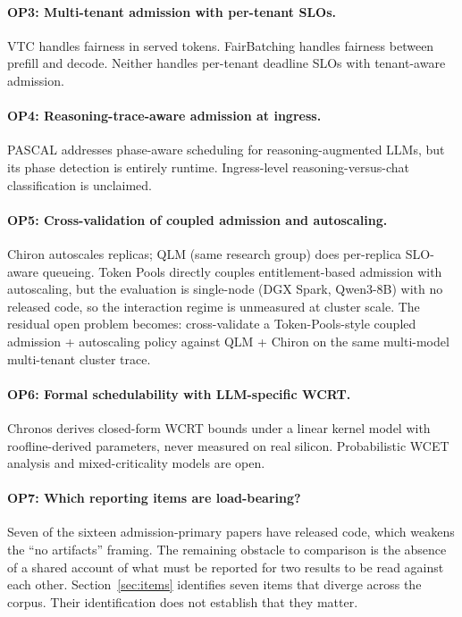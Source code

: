 \documentclass[10pt]{article} %
\theoremstyle{definition}
\begin{document}
\paragraph{OP3: Multi-tenant admission with per-tenant SLOs.}
VTC handles fairness in served tokens. FairBatching handles fairness
between prefill and decode. Neither handles per-tenant deadline SLOs
with tenant-aware admission.

\paragraph{OP4: Reasoning-trace-aware admission at ingress.}
PASCAL addresses phase-aware scheduling for reasoning-augmented LLMs,
but its phase detection is entirely runtime. Ingress-level
reasoning-versus-chat classification is unclaimed.

\paragraph{OP5: Cross-validation of coupled admission and autoscaling.}
Chiron autoscales replicas; QLM (same research group) does
per-replica SLO-aware queueing. Token Pools
\citep{cunningham2026tokenpools} directly couples entitlement-based
admission with autoscaling, but the evaluation is single-node
(DGX Spark, Qwen3-8B) with no released code, so the interaction
regime is unmeasured at cluster scale. The residual open problem
becomes: cross-validate a Token-Pools-style coupled admission +
autoscaling policy against QLM + Chiron on the same multi-model
multi-tenant cluster trace.

\paragraph{OP6: Formal schedulability with LLM-specific WCRT.}
Chronos derives closed-form WCRT bounds under a linear kernel model
with roofline-derived parameters, never measured on real silicon.
Probabilistic WCET analysis and mixed-criticality models are open.

\paragraph{OP7: Which reporting items are load-bearing?}
Seven of the sixteen admission-primary papers have released code, which
weakens the ``no artifacts'' framing. The remaining obstacle to
comparison is the absence of a shared account of what must be reported
for two results to be read against each other.
Section~\ref{sec:items} identifies seven items that diverge across the
corpus. Their identification does not establish that they matter.
\end{document}
